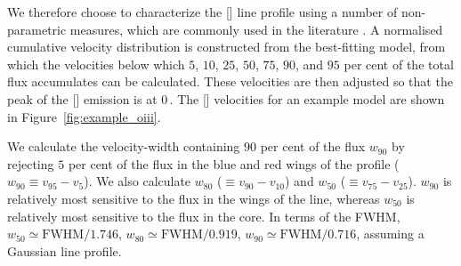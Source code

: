 We therefore choose to characterize the [] line profile using a number of non-parametric measures, which are commonly used in the literature \citep[e.g.][]{whittle85,zakamska14,zakamska16}.
A normalised cumulative velocity distribution is constructed from the best-fitting model, from which the velocities below which $5$, $10$, $25$, $50$, $75$, $90$, and $95$ per cent of the total flux accumulates can be calculated.
These velocities are then adjusted so that the peak of the [] emission is at $0$\,\kms.
The [] velocities for an example model are shown in Figure~\ref{fig:example_oiii}.

We calculate the velocity-width containing $90$ per cent of the flux $w_{90}$ by rejecting $5$ per cent of the flux in the blue and red wings of the profile ($w_{90}\equiv v_{95} - v_{5}$).
We also calculate $w_{80}$ ($\equiv v_{90} - v_{10}$) and $w_{50}$ ($\equiv v_{75} - v_{25}$).
$w_{90}$ is relatively most sensitive to the flux in the wings of the line, whereas $w_{50}$ is relatively most sensitive to the flux in the core.
In terms of the FWHM, $w_{50} \simeq \text{FWHM} / 1.746$, $w_{80} \simeq \text{FWHM} / 0.919$, $w_{90} \simeq \text{FWHM} / 0.716$, assuming a Gaussian line profile.


